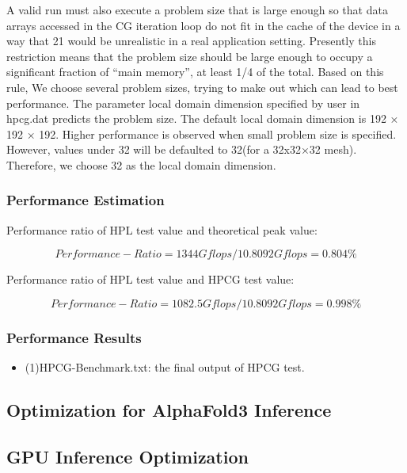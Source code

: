 \documentclass[a4paper,12pt]{article}
\begin{document}
A valid run must also execute a problem size that is large enough so that data arrays accessed in the CG iteration loop do not fit in the cache of the device in a way that 21 would be unrealistic in a real application setting. Presently this restriction means that the problem size should be large enough to occupy a significant fraction of “main memory”, at least 1/4 of the total. Based on this rule, We choose several problem sizes, trying to make out which can lead to best performance.
The parameter local domain dimension specified by user in hpcg.dat predicts the problem size. The default local domain dimension is 192 × 192 × 192. Higher performance is observed when small problem size is specified. However, values under 32 will be defaulted to 32(for a 32x32×32 mesh). Therefore, we choose 32 as the local domain dimension.

\subsubsection{Performance Estimation}

Performance ratio of HPL test value and theoretical peak value:

\begin{equation*}
Performance-Ratio = 1344Gflops/10.8092Gflops = 0.804\%
\end{equation*}

Performance ratio of HPL test value and HPCG test value:

\begin{equation*}
Performance-Ratio = 1082.5Gflops/10.8092Gflops = 0.998\%
\end{equation*}

\subsubsection{Performance Results}
\begin{itemize}
    \item (1)HPCG-Benchmark.txt: the final output of HPCG test.
\end{itemize}

\subsection{Optimization for AlphaFold3 Inference}

\subsection{GPU Inference Optimization}
\end{document}
